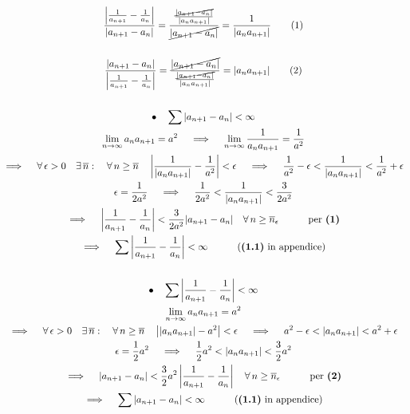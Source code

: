 \documentclass[11pt,reqno]{amsart}
\begin{document}
\begin{gather*}
  \frac{\left|\frac{1}{a_{n+1}}-\frac{1}{a_n}\right|}{|a_{n+1} - a_n|} = \frac{\frac{\cancel{|a_{n+1}-a_n|}}{|a_na_{n+1}|}}{\cancel{|a_{n+1}-a_n|}} = \frac{1}{|a_na_{n+1}|} \tag{1}\\\\
  \frac{|a_{n+1} - a_n|}{\left|\frac{1}{a_{n+1}}-\frac{1}{a_n}\right|} = \frac{\cancel{|a_{n+1}-a_n|}}{\frac{\cancel{|a_{n+1}-a_n|}}{|a_na_{n+1}|}} = |a_na_{n+1}| \tag{2}\\\\
  \bullet \quad \sum |a_{n+1} - a_n| < \infty\\
  \lim_{n \to \infty} a_na_{n+1} = a^2 \quad \implies \quad \lim_{n \to \infty} \frac{1}{a_na_{n+1}} = \frac{1}{a^2}\\
  \implies \quad \forall \, \epsilon > 0 \quad \exists \, \overline{n}: \quad \forall \, n \geq \overline{n} \quad \left|\frac{1}{|a_na_{n+1}|} - \frac{1}{a^2}\right| < \epsilon \quad \implies \quad \frac{1}{a^2} - \epsilon < \frac{1}{|a_na_{n+1}|} < \frac{1}{a^2} + \epsilon\\
  \epsilon = \frac{1}{2a^2} \quad \implies \quad \frac{1}{2a^2} < \frac{1}{|a_na_{n+1}|} < \frac{3}{2a^2}\\
  \implies \quad \left|\frac{1}{a_{n+1}}-\frac{1}{a_n}\right| < \frac{3}{2a^2}|a_{n+1} - a_n| \quad \forall \, n \geq \overline{n}_{\epsilon} \quad \quad \quad \text{per } \textbf{(1)}\\
  \implies \quad \sum \left|\frac{1}{a_{n+1}}-\frac{1}{a_n}\right| < \infty \quad \quad \quad \text{(} \textbf{(1.1)} \text{ in appendice)}\\\\
  \bullet \quad \sum \left|\frac{1}{a_{n+1}}-\frac{1}{a_n}\right| < \infty\\
  \lim_{n \to \infty} a_na_{n+1} = a^2\\
  \implies \quad \forall \, \epsilon > 0 \quad \exists \, \overline{n}: \quad \forall \, n \geq \overline{n} \quad \left||a_na_{n+1}| - a^2\right| < \epsilon \quad \implies \quad a^2 - \epsilon < |a_na_{n+1}| < a^2 + \epsilon\\
  \epsilon = \frac{1}{2}a^2 \quad \implies \quad \frac{1}{2}a^2 < |a_na_{n+1}| < \frac{3}{2}a^2\\
  \implies \quad |a_{n+1} - a_n| < \frac{3}{2}a^2\left|\frac{1}{a_{n+1}}-\frac{1}{a_n}\right| \quad \forall \, n \geq \overline{n}_{\epsilon} \quad \quad \quad \text{per } \textbf{(2)}\\
  \implies \quad \sum |a_{n+1} - a_n| < \infty \quad \quad \quad \text{(} \textbf{(1.1)} \text{ in appendice)}\\
\end{gather*}
\end{document}
